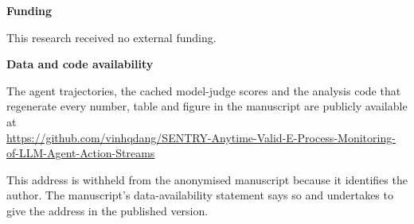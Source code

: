\documentclass[11pt]{article}
\begin{document}
\vspace{1em}
\noindent\textbf{Funding}

\vspace{0.4em}
\noindent
This research received no external funding.

\vspace{1em}
\noindent\textbf{Data and code availability}

\vspace{0.4em}
\noindent
The agent trajectories, the cached model-judge scores and the analysis code that
regenerate every number, table and figure in the manuscript are publicly
available at\\
\url{https://github.com/vinhqdang/SENTRY-Anytime-Valid-E-Process-Monitoring-of-LLM-Agent-Action-Streams}

\noindent
This address is withheld from the anonymised manuscript because it identifies the
author. The manuscript's data-availability statement says so and undertakes to
give the address in the published version.
\end{document}
